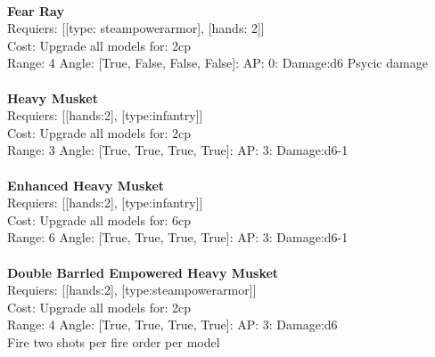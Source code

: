 \ \\
{\bf Fear Ray } \\

Requiers: [[type: steampowerarmor], [hands: 2]] \\
Cost: Upgrade all models for: 2cp \\


Range: 4  Angle: [True, False, False, False]: AP: 0: Damage:d6 Psycic damage \\








\ \\
{\bf Heavy Musket } \\

Requiers: [[hands:2], [type:infantry]] \\
Cost: Upgrade all models for: 2cp \\


Range: 3  Angle: [True, True, True, True]: AP: 3: Damage:d6-1 \\








\ \\
{\bf Enhanced Heavy Musket } \\

Requiers: [[hands:2], [type:infantry]] \\
Cost: Upgrade all models for: 6cp \\


Range: 6  Angle: [True, True, True, True]: AP: 3: Damage:d6-1 \\








\ \\
{\bf Double Barrled Empowered Heavy Musket } \\

Requiers: [[hands:2], [type:steampowerarmor]] \\
Cost: Upgrade all models for: 2cp \\


Range: 4  Angle: [True, True, True, True]: AP: 3: Damage:d6 \\
Fire two shots per fire order per model\\ 








